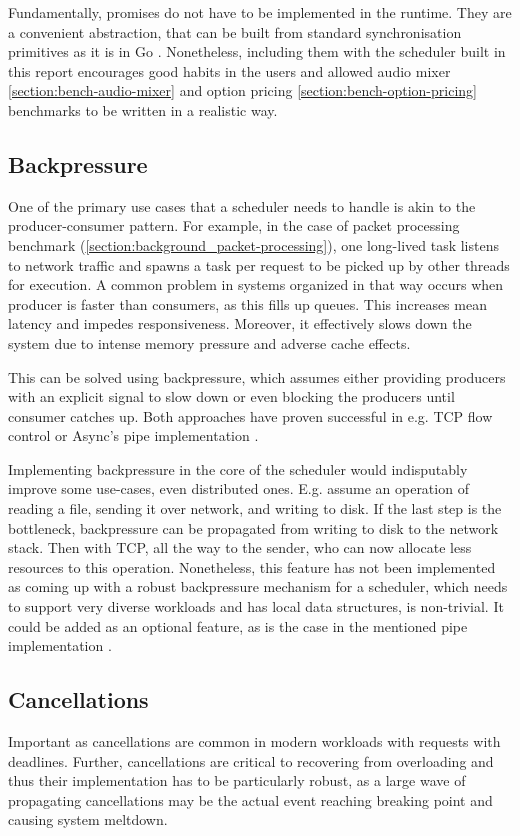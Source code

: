 \documentclass[12pt,a4paper,twoside]{report}
\begin{document}
Fundamentally, promises do not have to be implemented in the runtime. They are a convenient abstraction, that can be built from standard synchronisation primitives as it is in Go . Nonetheless, including them with the scheduler built in this report encourages good habits in the users and allowed audio mixer 
\ref{section:bench-audio-mixer} and option pricing \ref{section:bench-option-pricing} benchmarks to be written in a realistic way. 


\subsection{Backpressure}
One of the primary use cases that a scheduler needs to handle is akin to the producer-consumer pattern. For example, in the case of packet processing benchmark (\ref{section:background_packet-processing}), one long-lived task listens to network traffic and spawns a task per request to be picked up by other threads for execution. A common problem in systems organized in that way occurs when producer is faster than consumers, as this fills up queues. This increases mean latency and impedes responsiveness. Moreover, it effectively slows down the system due to intense memory pressure and adverse cache effects.

This can be solved using backpressure, which assumes either providing producers with an explicit signal to slow down or even blocking the producers until consumer catches up. Both approaches have proven successful in e.g. TCP flow control \cite{rfc793} or Async's pipe implementation \cite{async_kernel}. 

Implementing backpressure in the core of the scheduler would indisputably improve some use-cases, even distributed ones. E.g. assume an operation of reading a file, sending it over network, and writing to disk. If the last step is the bottleneck, backpressure can be propagated from writing to disk to the network stack. Then with TCP, all the way to the sender, who can now allocate less resources to this operation. Nonetheless, this feature has not been implemented as coming up with a robust backpressure mechanism for a scheduler, which needs to support very diverse workloads and has local data structures, is non-trivial. It could be added as an optional feature, as is the case in the mentioned pipe implementation \cite{async_kernel}. 


\subsection{Cancellations}
Important as cancellations are common in modern workloads with requests with deadlines. Further, cancellations are critical to recovering from overloading and thus their implementation has to be particularly robust, as a large wave of propagating cancellations may be the actual event reaching breaking point and causing system meltdown.  
\end{document}
